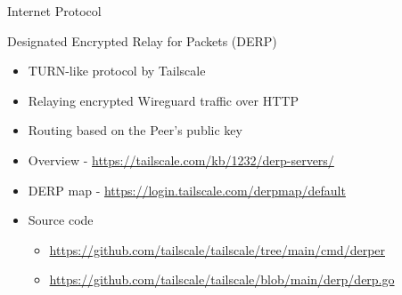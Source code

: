 \begin{block}{Internet Protocol}
\begin{block}{Designated Encrypted Relay for Packets (DERP)}
\label{notes__02021-internet-protocol.md__designated-encrypted-relay-for-packets-derp}
\begin{itemize}
\item
  TURN-like protocol by Tailscale
\item
  Relaying encrypted Wireguard traffic over HTTP
\item
  Routing based on the Peer's public key
\item
  Overview - \url{https://tailscale.com/kb/1232/derp-servers/}
\item
  DERP map - \url{https://login.tailscale.com/derpmap/default}
\item
  Source code

  \begin{itemize}
  \item
    \url{https://github.com/tailscale/tailscale/tree/main/cmd/derper}
  \item
    \url{https://github.com/tailscale/tailscale/blob/main/derp/derp.go}
  \end{itemize}
\end{itemize}
\end{block}
\end{block}

